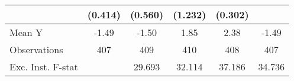 {\begin{tabular}{l*{5}{c}}
            &     (0.414)         &     (0.560)         &     (1.232)         &     (0.302)         &                     \\
\midrule
Mean Y      &       -1.49         &       -1.50         &        1.85         &        2.38         &       -1.49         \\
Observations&         407         &         409         &         410         &         408         &         407         \\
Exc. Inst. F-stat&                     &      29.693         &      32.114         &      37.186         &      34.736         \\
\bottomrule
\end{tabular}
}
